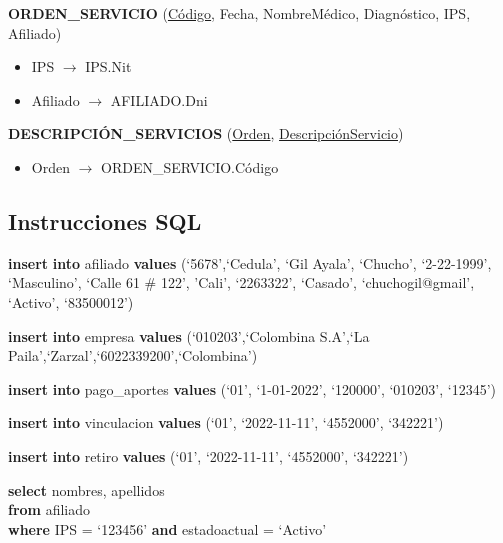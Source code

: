 \documentclass[12pt,a4paper]{article}
\begin{document}
\begin{tcolorbox}
\textbf{ORDEN\_SERVICIO} (\underline{Código}, Fecha, NombreMédico, Diagnóstico, IPS, Afiliado)
\begin{itemize}
\item IPS $\rightarrow$ IPS.Nit
\item Afiliado $\rightarrow$ AFILIADO.Dni
\end{itemize}
\textbf{DESCRIPCIÓN\_SERVICIOS} (\underline{Orden}, \underline{DescripciónServicio})
\begin{itemize}
\item Orden $\rightarrow$ ORDEN\_SERVICIO.Código
\end{itemize}
\end{tcolorbox}
\subsection{Instrucciones SQL}
\begin{tcolorbox}[title=Insertar afiliado]
\textbf{insert} \textbf{into} afiliado \textbf{values} (`5678',`Cedula', `Gil Ayala', `Chucho',
 `2-22-1999', `Masculino', `Calle 61 \# 122', 'Cali', `2263322', `Casado',
 `chuchogil@gmail', `Activo', `83500012')
\end{tcolorbox}
\begin{tcolorbox}[title=Insertar empresa]
\textbf{insert} \textbf{into} empresa \textbf{values} (`010203',`Colombina S.A',`La Paila',`Zarzal',`6022339200',`Colombina')
\end{tcolorbox}
\begin{tcolorbox}[title=Insertar pago de aportes]
\textbf{insert} \textbf{into} pago\_aportes \textbf{values} (`01', `1-01-2022', `120000', `010203', `12345')
\end{tcolorbox}
\begin{tcolorbox}[title=Insertar vinculación]
\textbf{insert} \textbf{into} vinculacion \textbf{values} (`01', `2022-11-11', `4552000', `342221')
\end{tcolorbox}
\begin{tcolorbox}[title=Insertar retiro]
\textbf{insert} \textbf{into} retiro \textbf{values} (`01', `2022-11-11', `4552000', `342221')
\end{tcolorbox}
\begin{tcolorbox}[title=Listado de afiliados activos de una IPS]
\textbf{select} nombres, apellidos\\
\textbf{from} afiliado\\
\textbf{where} IPS = `123456' \textbf{and} estadoactual = `Activo'
\end{tcolorbox}
\end{document}
